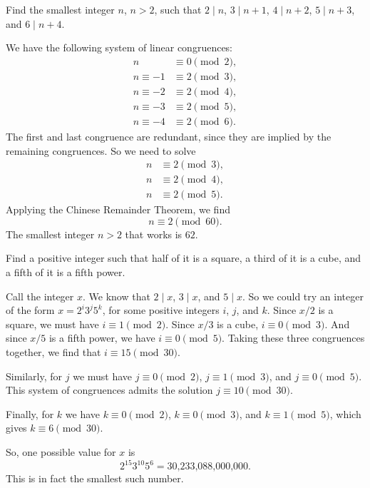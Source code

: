  Find the smallest integer $n$, $n > 2$, such that
$2\mid n$, $3\mid n + 1$, $4\mid n + 2$, $5\mid n + 3$, and
$6\mid n+4$.
\begin{solution}
  We have the following system of linear congruences:
  \begin{align*}
    n&\equiv0\pmod2, \\
    n\equiv-1&\equiv2\pmod3, \\
    n\equiv-2&\equiv2\pmod4, \\
    n\equiv-3&\equiv2\pmod5, \\
    n\equiv-4&\equiv2\pmod6.
  \end{align*}
  The first and last congruence are redundant, since they are implied
  by the remaining congruences. So we need to solve
  \begin{align*}
    n&\equiv2\pmod3, \\
    n&\equiv2\pmod4, \\
    n&\equiv2\pmod5.
  \end{align*}
  Applying the Chinese Remainder Theorem, we find
  \begin{equation*}
    n\equiv2\pmod{60}.
  \end{equation*}
  The smallest integer $n>2$ that works is $62$.
\end{solution}

 Find a positive integer such that half of it is a square,
a third of it is a cube, and a fifth of it is a fifth power.
\begin{solution}
  Call the integer $x$. We know that $2\mid x$, $3\mid x$, and
  $5\mid x$. So we could try an integer of the form $x = 2^i3^j5^k$,
  for some positive integers $i$, $j$, and $k$. Since $x/2$ is a
  square, we must have $i\equiv1\pmod2$. Since $x/3$ is a cube,
  $i\equiv0\pmod3$. And since $x/5$ is a fifth power, we have
  $i\equiv0\pmod5$. Taking these three congruences together, we find
  that $i\equiv15\pmod{30}$.

  Similarly, for $j$ we must have $j\equiv0\pmod2$, $j\equiv1\pmod3$,
  and $j\equiv0\pmod5$. This system of congruences admits the solution
  $j\equiv10\pmod{30}$.

  Finally, for $k$ we have $k\equiv0\pmod2$, $k\equiv0\pmod3$, and
  $k\equiv1\pmod5$, which gives $k\equiv6\pmod{30}$.

  So, one possible value for $x$ is
  \begin{equation*}
    2^{15}3^{10}5^6 = \text{30,233,088,000,000}.
  \end{equation*}
  This is in fact the smallest such number.
\end{solution}

